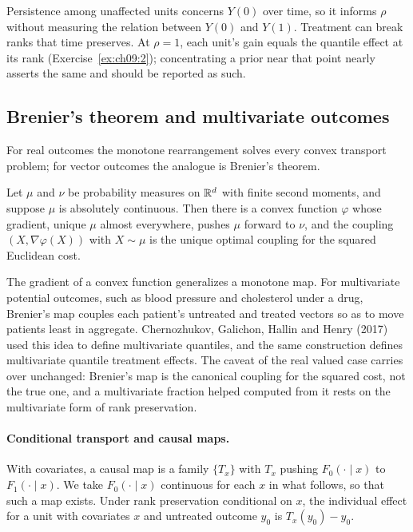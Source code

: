 Persistence among unaffected units concerns $Y(0)$ over time, so it informs $\rho$ without measuring the relation between $Y(0)$ and $Y(1)$. Treatment can break ranks that time preserves. At $\rho = 1$, each unit's gain equals the quantile effect at its rank (Exercise~\ref{ex:ch09:2}); concentrating a prior near that point nearly asserts the same and should be reported as such.

\subsection{Brenier's theorem and multivariate outcomes}

For real outcomes the monotone rearrangement solves every convex transport problem; for vector outcomes the analogue is Brenier's theorem.

\begin{theorem}[Brenier]
Let $\mu$ and $\nu$ be probability measures on $\mathbb{R}^d$ with finite second moments, and suppose $\mu$ is absolutely continuous. Then there is a convex function $\varphi$ whose gradient, unique $\mu$ almost everywhere, pushes $\mu$ forward to $\nu$, and the coupling $(X, \nabla\varphi(X))$ with $X \sim \mu$ is the unique optimal coupling for the squared Euclidean cost.
\end{theorem}

The gradient of a convex function generalizes a monotone map. For multivariate potential outcomes, such as blood pressure and cholesterol under a drug, Brenier's map couples each patient's untreated and treated vectors so as to move patients least in aggregate. Chernozhukov, Galichon, Hallin and Henry (2017) used this idea to define multivariate quantiles, and the same construction defines multivariate quantile treatment effects. The caveat of the real valued case carries over unchanged: Brenier's map is the canonical coupling for the squared cost, not the true one, and a multivariate fraction helped computed from it rests on the multivariate form of rank preservation.

\paragraph{Conditional transport and causal maps.} With covariates, a causal map is a family $\{T_x\}$ with $T_x$ pushing $F_0(\cdot \mid x)$ to $F_1(\cdot \mid x)$. We take $F_0(\cdot \mid x)$ continuous for each $x$ in what follows, so that such a map exists. Under rank preservation conditional on $x$, the individual effect for a unit with covariates $x$ and untreated outcome $y_0$ is $T_x(y_0) - y_0$.

